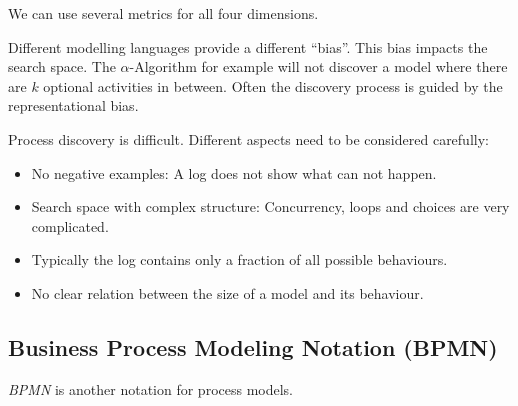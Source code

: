 \documentclass[english]{panikzettel}
\begin{document}
We can use several metrics for all four dimensions.

Different modelling languages provide a different ``bias''. This bias impacts the search space. The $\alpha$-Algorithm for example will not discover a model where there are $k$ optional activities in between. Often the discovery process is guided by the representational bias.

Process discovery is difficult. Different aspects need to be considered carefully:
\begin{itemize}
    \item No negative examples: A log does not show what can not happen.
    \item Search space with complex structure: Concurrency, loops and choices are very complicated.
    \item Typically the log contains only a fraction of all possible behaviours.
    \item No clear relation between the size of a model and its behaviour.
\end{itemize}

\subsection{Business Process Modeling Notation (BPMN)}

\emph{BPMN} is another notation for process models.
\end{document}
